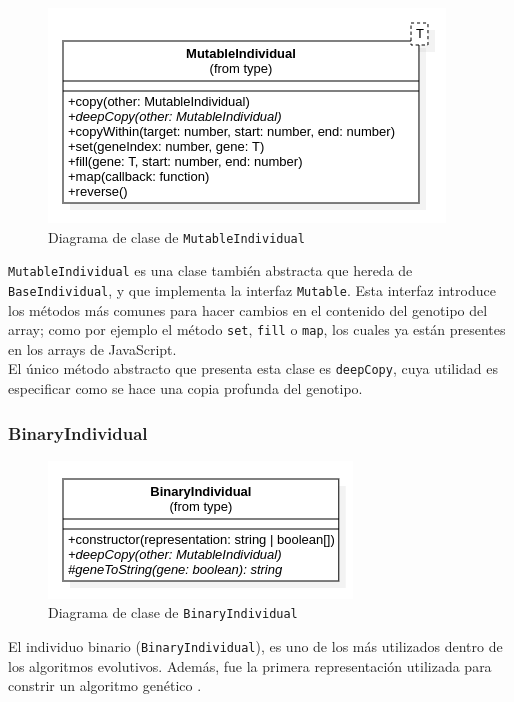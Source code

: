 \begin{figure}[ht]
    \centering
    \includegraphics[scale=0.6]{mem/images/cap-4/4.2.2(Individuos)/MutableIndividual.png}
    \caption{Diagrama de clase de \texttt{MutableIndividual}}
    \label{fig:mutableindividual-uml}
\end{figure}

\texttt{MutableIndividual} es una clase también abstracta que hereda de \texttt{BaseIndividual}, y que implementa la interfaz \texttt{Mutable}. Esta interfaz introduce los métodos más comunes para hacer cambios en el contenido del genotipo del array; como por ejemplo el método \texttt{set}, \texttt{fill} o \texttt{map}, los cuales ya están presentes en los arrays de JavaScript. \\

El único método abstracto que presenta esta clase es \texttt{deepCopy}, cuya utilidad es especificar como se hace una copia profunda del genotipo.

\subsubsection{BinaryIndividual}

\begin{figure}[ht]
    \centering
    \includegraphics[scale=0.7]{mem/images/cap-4/4.2.2(Individuos)/BinaryIndividual.png}
    \caption{Diagrama de clase de \texttt{BinaryIndividual}}
    \label{fig:binaryindividual-uml}
\end{figure}

El individuo binario (\texttt{BinaryIndividual}), es uno de los más utilizados dentro de los algoritmos evolutivos. Además, fue la primera representación utilizada para constrir un algoritmo genético \cite{holland1992adaptation}. \\

